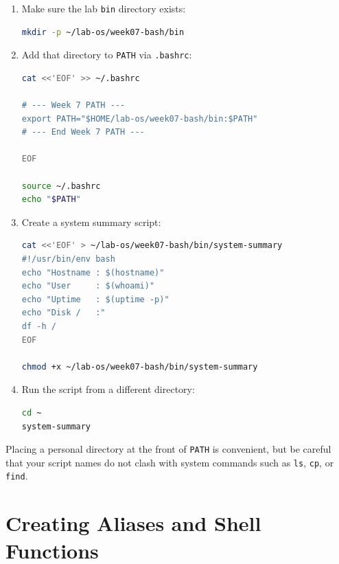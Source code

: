 \begin{enumerate}
  \item Make sure the lab \texttt{bin} directory exists:
\begin{lstlisting}[language=bash, caption={Preparing the bin directory}]
mkdir -p ~/lab-os/week07-bash/bin
\end{lstlisting}

  \item Add that directory to \texttt{PATH} via \texttt{.bashrc}:
\begin{lstlisting}[language=bash, caption={Adding the bin directory to PATH}]
cat <<'EOF' >> ~/.bashrc

# --- Week 7 PATH ---
export PATH="$HOME/lab-os/week07-bash/bin:$PATH"
# --- End Week 7 PATH ---

EOF

source ~/.bashrc
echo "$PATH"
\end{lstlisting}

  \item Create a system summary script:
\begin{lstlisting}[language=bash, caption={Creating a system-summary script}]
cat <<'EOF' > ~/lab-os/week07-bash/bin/system-summary
#!/usr/bin/env bash
echo "Hostname : $(hostname)"
echo "User     : $(whoami)"
echo "Uptime   : $(uptime -p)"
echo "Disk /   :"
df -h /
EOF

chmod +x ~/lab-os/week07-bash/bin/system-summary
\end{lstlisting}

  \item Run the script from a different directory:
\begin{lstlisting}[language=bash, caption={Running the script from any location}]
cd ~
system-summary
\end{lstlisting}
\end{enumerate}

\begin{notebox}
Placing a personal directory at the front of \texttt{PATH} is convenient, but
be careful that your script names do not clash with system commands such as
\texttt{ls}, \texttt{cp}, or \texttt{find}.
\end{notebox}

\section{Creating Aliases and Shell Functions}
\label{sec:aliases-functions}

